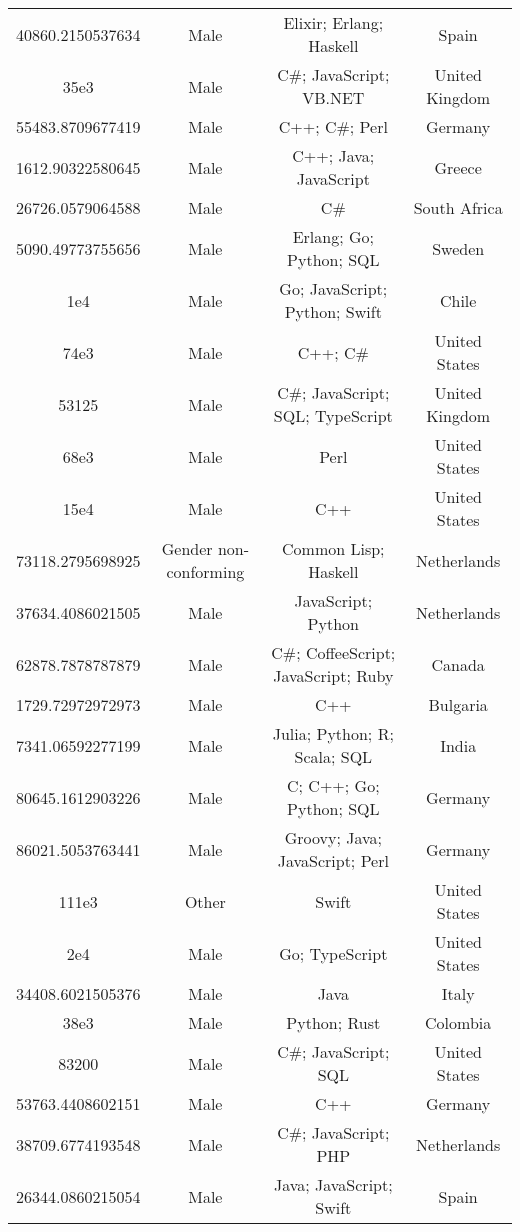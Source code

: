 \begin{center}
\begin{tabular}{ |c|c|c|c| }
40860.2150537634  &  Male  &  Elixir; Erlang; Haskell  &  Spain  \\ 
35e3  &  Male  &  C\#; JavaScript; VB.NET  &  United Kingdom  \\ 
55483.8709677419  &  Male  &  C++; C\#; Perl  &  Germany  \\ 
1612.90322580645  &  Male  &  C++; Java; JavaScript  &  Greece  \\ 
26726.0579064588  &  Male  &  C\#  &  South Africa  \\ 
5090.49773755656  &  Male  &  Erlang; Go; Python; SQL  &  Sweden  \\ 
1e4  &  Male  &  Go; JavaScript; Python; Swift  &  Chile  \\ 
74e3  &  Male  &  C++; C\#  &  United States  \\ 
53125  &  Male  &  C\#; JavaScript; SQL; TypeScript  &  United Kingdom  \\ 
68e3  &  Male  &  Perl  &  United States  \\ 
15e4  &  Male  &  C++  &  United States  \\ 
73118.2795698925  &  Gender non-conforming  &  Common Lisp; Haskell  &  Netherlands  \\ 
37634.4086021505  &  Male  &  JavaScript; Python  &  Netherlands  \\ 
62878.7878787879  &  Male  &  C\#; CoffeeScript; JavaScript; Ruby  &  Canada  \\ 
1729.72972972973  &  Male  &  C++  &  Bulgaria  \\ 
7341.06592277199  &  Male  &  Julia; Python; R; Scala; SQL  &  India  \\ 
80645.1612903226  &  Male  &  C; C++; Go; Python; SQL  &  Germany  \\ 
86021.5053763441  &  Male  &  Groovy; Java; JavaScript; Perl  &  Germany  \\ 
111e3  &  Other  &  Swift  &  United States  \\ 
2e4  &  Male  &  Go; TypeScript  &  United States  \\ 
34408.6021505376  &  Male  &  Java  &  Italy  \\ 
38e3  &  Male  &  Python; Rust  &  Colombia  \\ 
83200  &  Male  &  C\#; JavaScript; SQL  &  United States  \\ 
53763.4408602151  &  Male  &  C++  &  Germany  \\ 
38709.6774193548  &  Male  &  C\#; JavaScript; PHP  &  Netherlands  \\ 
26344.0860215054  &  Male  &  Java; JavaScript; Swift  &  Spain  \\ 

\end{tabular}
\end{center}
